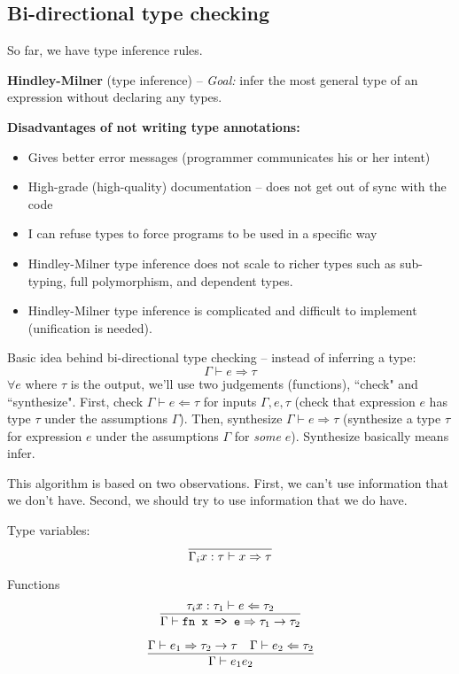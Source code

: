 \documentclass[11pt]{article}
\begin{document}
\subsection{Bi-directional type checking}
So far, we have type inference rules. 

\textbf{Hindley-Milner} (type inference) -- \emph{Goal:} infer the most general type of an expression without declaring any types.

\textbf{Disadvantages of not writing type annotations:}
\begin{itemize}
    \item Gives better error messages (programmer communicates his or her intent)
    \item High-grade (high-quality) documentation -- does not get out of sync with the code
    \item I can refuse types to force programs to be used in a specific way
    \item Hindley-Milner type inference does not scale to richer types such as sub-typing, full polymorphism, and dependent types. 
    \item Hindley-Milner type inference is complicated and difficult to implement (unification is needed).
\end{itemize}

Basic idea behind bi-directional type checking -- instead of inferring a type:
    \[
        \Gamma \vdash e \Rightarrow \tau
    \]
$\forall e$ where $\tau$ is the output, we'll use two judgements (functions), ``check" and ``synthesize". First, check $\Gamma \vdash e \Leftarrow \tau$ for inputs $\Gamma, e, \tau$ (check that expression $e$ has type $\tau$ under the assumptions $\Gamma$). Then, synthesize $\Gamma \vdash e \Rightarrow \tau$ (synthesize a type $\tau$ for expression $e$ under the assumptions $\Gamma$ for \emph{some} $e$). Synthesize basically means infer.

This algorithm is based on two observations. First, we can't use information that we don't have. Second, we should try to use information that we do have. 

Type variables:
\[
    \infer{\Gamma_i x : \tau \vdash x \Rightarrow \tau}{}
\]

Functions
\[
    \infer{\Gamma \vdash \verb~fn x => e~ \Rightarrow \tau_1 \rightarrow \tau_2}{
        \tau_i x : \tau_1 \vdash e \Leftarrow \tau_2
    }
\]

\[
    \infer{\Gamma \vdash e_1 e_2}{
        \Gamma \vdash e_1 \Rightarrow \tau_2 \rightarrow \tau
        &
        \Gamma \vdash e_2 \Leftarrow \tau_2
    }
\]
\end{document}
